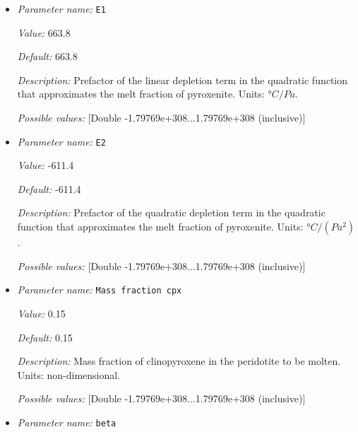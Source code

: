 \begin{itemize}
{\it Value:} -5.1e-18


{\it Default:} -5.1e-18


{\it Description:} Prefactor of the quadratic pressure term in the quadratic function that approximates the solidus of pyroxenite. Units: $°C/(Pa^2)$.


{\it Possible values:} [Double -1.79769e+308...1.79769e+308 (inclusive)]
\item {\it Parameter name:} {\tt E1}
\label{parameters:Postprocess/Visualization/Melt fraction/E1}


{\it Value:} 663.8


{\it Default:} 663.8


{\it Description:} Prefactor of the linear depletion term in the quadratic function that approximates the melt fraction of pyroxenite. Units: $°C/Pa$.


{\it Possible values:} [Double -1.79769e+308...1.79769e+308 (inclusive)]
\item {\it Parameter name:} {\tt E2}
\label{parameters:Postprocess/Visualization/Melt fraction/E2}


{\it Value:} -611.4


{\it Default:} -611.4


{\it Description:} Prefactor of the quadratic depletion term in the quadratic function that approximates the melt fraction of pyroxenite. Units: $°C/(Pa^2)$.


{\it Possible values:} [Double -1.79769e+308...1.79769e+308 (inclusive)]
\item {\it Parameter name:} {\tt Mass fraction cpx}
\label{parameters:Postprocess/Visualization/Melt fraction/Mass fraction cpx}


{\it Value:} 0.15


{\it Default:} 0.15


{\it Description:} Mass fraction of clinopyroxene in the peridotite to be molten. Units: non-dimensional.


{\it Possible values:} [Double -1.79769e+308...1.79769e+308 (inclusive)]
\item {\it Parameter name:} {\tt beta}
\label{parameters:Postprocess/Visualization/Melt fraction/beta}



\end{itemize}
